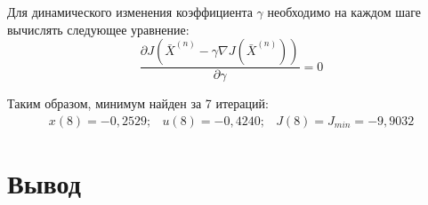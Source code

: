 \documentclass[14pt, a4paper]{extarticle}
\begin{document}
	Для динамического изменения коэффициента $\gamma$ необходимо на каждом шаге вычислять следующее уравнение:
	$$\frac{\partial J(\bar{X}^{(n)}-\gamma\nabla J(\bar{X}^{(n)}))}{\partial \gamma}=0$$
	
	Таким образом, минимум найден за 7 итераций:
	$$\begin{matrix}
		x(8)=-0,2529; & u(8)=-0,4240; & J(8)=J_{min}=-9,9032
	\end{matrix}$$
	\newpage
	
	\section*{Вывод}
	

	
\end{document}
